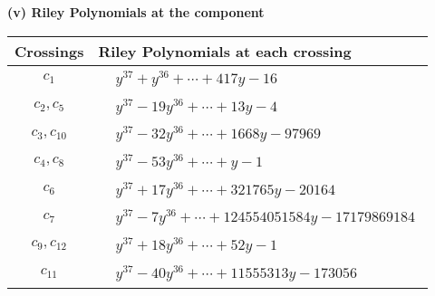 \documentclass[1p]{elsarticle_modified}
\theoremstyle{definition}
\begin{document}
\newpage\renewcommand{\arraystretch}{1}
\flushleft \textbf{(v) Riley Polynomials at the component}\newline \\
\begin{tabular}{m{50pt}|m{274pt}}
Crossings & \hspace{64pt}Riley Polynomials at each crossing \\
\hline $$\begin{aligned}c_{1}\end{aligned}$$&$\begin{aligned}
&y^{37}+y^{36}+\cdots+417 y-16
\end{aligned}$\\
\hline $$\begin{aligned}c_{2},c_{5}\end{aligned}$$&$\begin{aligned}
&y^{37}-19 y^{36}+\cdots+13 y-4
\end{aligned}$\\
\hline $$\begin{aligned}c_{3},c_{10}\end{aligned}$$&$\begin{aligned}
&y^{37}-32 y^{36}+\cdots+1668 y-97969
\end{aligned}$\\
\hline $$\begin{aligned}c_{4},c_{8}\end{aligned}$$&$\begin{aligned}
&y^{37}-53 y^{36}+\cdots+y-1
\end{aligned}$\\
\hline $$\begin{aligned}c_{6}\end{aligned}$$&$\begin{aligned}
&y^{37}+17 y^{36}+\cdots+321765 y-20164
\end{aligned}$\\
\hline $$\begin{aligned}c_{7}\end{aligned}$$&$\begin{aligned}
&y^{37}-7 y^{36}+\cdots+124554051584 y-17179869184
\end{aligned}$\\
\hline $$\begin{aligned}c_{9},c_{12}\end{aligned}$$&$\begin{aligned}
&y^{37}+18 y^{36}+\cdots+52 y-1
\end{aligned}$\\
\hline $$\begin{aligned}c_{11}\end{aligned}$$&$\begin{aligned}
&y^{37}-40 y^{36}+\cdots+11555313 y-173056
\end{aligned}$\\
\hline
\end{tabular}\\~\\
\end{document}
